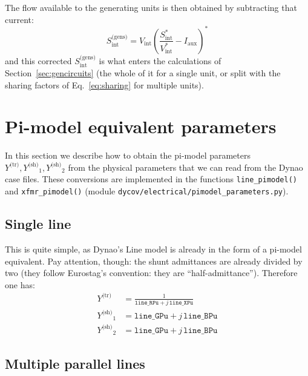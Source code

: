 \documentclass[a4paper,11pt]{article}
\newcommand{\code}[1]{\texttt{#1}}  %
\newcommand{\Dynawo}{Dyna\textomega o} %
\newcommand{\Ytr}{\ensuremath{Y^{\textrm{(tr)}}}}
\newcommand{\Ysh}{\ensuremath{Y^{\textrm{(sh)}}}}
\begin{document}
The flow available to the generating units is then obtained by subtracting that current:
\begin{equation}
  S_{\textrm{int}}^{\textrm{(gens)}}
    = V_{\textrm{int}} \left( \frac{S_{\textrm{int}}^*}{V_{\textrm{int}}^*}
      - I_{\textrm{aux}} \right)^{\!*}
\end{equation}
and this corrected $S_{\textrm{int}}^{\textrm{(gens)}}$ is what enters the calculations
of Section~\ref{sec:gencircuits} (the whole of it for a single unit, or split with the
sharing factors of Eq.~\eqref{eq:sharing} for multiple units).




\newpage
\appendix
\appendixpage
\addappheadtotoc

\section{Pi-model equivalent parameters}
\label{app:pimodel}

In this section we describe how to obtain the pi-model parameters $\Ytr, \Ysh_1,
\Ysh_2$ from the physical parameters that we can read from the \Dynawo{} case
files. These conversions are implemented in the functions \code{line\_pimodel()} and
\code{xfmr\_pimodel()} (module \code{dycov/electrical/pimodel\_parameters.py}).


\subsection{Single line}
\label{app:line}

This is quite simple, as \Dynawo's Line model is already in the form of a
pi-model equivalent. Pay attention, though: the shunt admittances are already
divided by two (they follow Eurostag's convention: they are
``half-admittance'').  Therefore one has:
\begin{equation}
  \begin{split}
    \Ytr   & = \frac{1}{\code{line\_RPu} + j \, \code{line\_XPu}} \\
    \Ysh_1 & = \code{line\_GPu} + j \, \code{line\_BPu} \\
    \Ysh_2 & = \code{line\_GPu} + j \, \code{line\_BPu}
  \end{split}
\end{equation}


\subsection{Multiple parallel lines}
\label{app:parallel}
\end{document}
